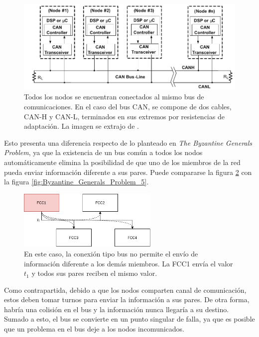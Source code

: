 \begin{figure}[H]
    \centering
    \includegraphics[width=\textwidth]{img/red_CAN.png}
    \caption{Todos los nodos se encuentran conectados al mismo bus de comunicaciones. En el caso del bus CAN, se compone de dos cables, CAN-H y CAN-L, terminados en sus extremos por resistencias de adaptación. La imagen se extrajo de \cite{texasSLOA101B}.}
    \label{fig:red_CAN}
\end{figure}

Esto presenta una diferencia respecto de lo planteado en \textit{The Byzantine Generals Problem}, ya que la existencia de un bus común a todos los nodos automáticamente elimina la posibilidad de que uno de los miembros de la red pueda enviar información diferente a sus pares. Puede compararse la figura \ref{fig:byzantine_bus_1} con la figura \ref{fig:Byzantine_Generals_Problem_5}.

\begin{figure}[H]
    \centering
    \includegraphics[width=0.6\textwidth]{img/byzantine_bus_1.png}
    \caption{En este caso, la conexión tipo bus no permite el envío de información diferente a los demás miembros. La FCC1 envía el valor $t_1$ y todos sus pares reciben el mismo valor.}
    \label{fig:byzantine_bus_1}    
\end{figure}

Como contrapartida, debido a que los nodos comparten canal de comunicación, estos deben tomar turnos para enviar la información a sus pares. De otra forma, habría una colisión en el bus y la información nunca llegaría a su destino. Sumado a esto, el bus se convierte en un punto singular de falla, ya que es posible que un problema en el bus deje a los nodos incomunicados.\\

